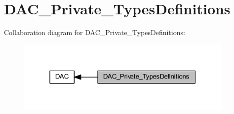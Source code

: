 \hypertarget{group___d_a_c___private___types_definitions}{}\section{D\+A\+C\+\_\+\+Private\+\_\+\+Types\+Definitions}
\label{group___d_a_c___private___types_definitions}
Collaboration diagram for D\+A\+C\+\_\+\+Private\+\_\+\+Types\+Definitions\+:
\nopagebreak
\begin{figure}[H]
\begin{center}
\leavevmode
\includegraphics[width=301pt]{group___d_a_c___private___types_definitions}
\end{center}
\end{figure}
